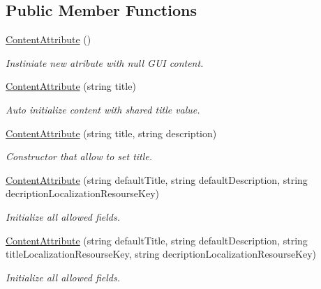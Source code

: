 \subsection*{Public Member Functions}
\begin{DoxyCompactItemize}
\item 
\mbox{\hyperlink{class_wpf_handler_1_1_u_i_1_1_auto_layout_1_1_configuration_1_1_content_attribute_acdfac4309551dd388a4f039b9e9263dc}{Content\+Attribute}} ()
\begin{DoxyCompactList}\small\item\em Instiniate new atribute with null G\+UI content. \end{DoxyCompactList}\item 
\mbox{\hyperlink{class_wpf_handler_1_1_u_i_1_1_auto_layout_1_1_configuration_1_1_content_attribute_ac65e5b234d917c37a95b5471ef8b41b0}{Content\+Attribute}} (string title)
\begin{DoxyCompactList}\small\item\em Auto initialize content with shared title value. \end{DoxyCompactList}\item 
\mbox{\hyperlink{class_wpf_handler_1_1_u_i_1_1_auto_layout_1_1_configuration_1_1_content_attribute_ac44c492fbdc06f7a28f77c4dcb50e828}{Content\+Attribute}} (string title, string description)
\begin{DoxyCompactList}\small\item\em Constructor that allow to set title. \end{DoxyCompactList}\item 
\mbox{\hyperlink{class_wpf_handler_1_1_u_i_1_1_auto_layout_1_1_configuration_1_1_content_attribute_ab0c84b73301dd184abc00bbf5204c178}{Content\+Attribute}} (string default\+Title, string default\+Description, string decription\+Localization\+Resourse\+Key)
\begin{DoxyCompactList}\small\item\em Initialize all allowed fields. \end{DoxyCompactList}\item 
\mbox{\hyperlink{class_wpf_handler_1_1_u_i_1_1_auto_layout_1_1_configuration_1_1_content_attribute_a54c8ed64b08dbbf380bfb47cbe2829e2}{Content\+Attribute}} (string default\+Title, string default\+Description, string title\+Localization\+Resourse\+Key, string decription\+Localization\+Resourse\+Key)
\begin{DoxyCompactList}\small\item\em Initialize all allowed fields. \end{DoxyCompactList}\item 

\end{DoxyCompactItemize}
